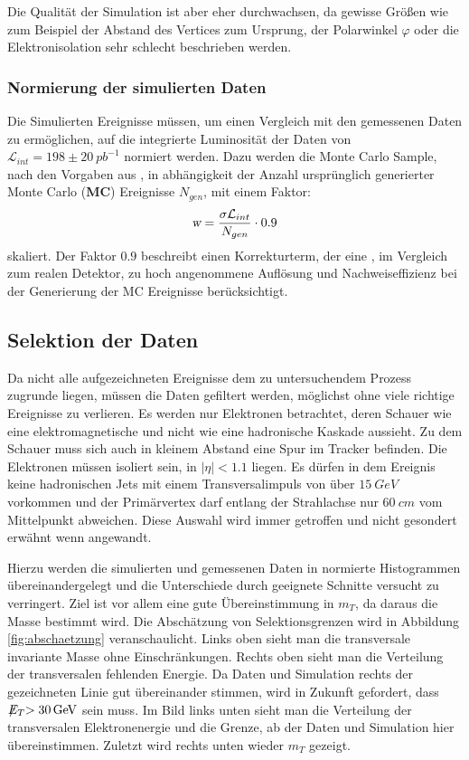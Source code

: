 \documentclass[a4paper,12pt]{article}
\newcommand{\met}{\ensuremath{\not\mathrel{E}}_T}
\begin{document}
Die Qualität der Simulation ist aber eher durchwachsen, da gewisse Größen wie zum Beispiel der
Abstand des Vertices zum Ursprung, der Polarwinkel $φ$ oder die Elektronisolation sehr schlecht
beschrieben werden.

\subsubsection*{Normierung der simulierten Daten}
Die Simulierten Ereignisse müssen, um einen Vergleich mit den gemessenen Daten zu ermöglichen, auf die 
integrierte Luminosität der Daten von $\mathcal{L}_{int}=198 \pm \SI{20}{pb^{-1}}$ normiert werden. 
Dazu werden die Monte Carlo Sample, nach den Vorgaben aus \cite{versuchsanleitung},
in abhängigkeit der Anzahl ursprünglich generierter Monte Carlo (\textbf{MC}) Ereignisse $N_{gen}$, mit einem Faktor:
\begin{align*}
	\textsl{w}= \frac{\sigma \mathcal{L}_{int}}{N_{gen}} \cdot 0.9
\end{align*}
skaliert. Der Faktor $0.9$ beschreibt einen Korrekturterm, der eine , im Vergleich zum realen Detektor,
zu hoch angenommene Auflösung und Nachweiseffizienz bei der Generierung der MC Ereignisse berücksichtigt.

\subsection{Selektion der Daten}
Da nicht alle aufgezeichneten Ereignisse dem zu untersuchendem Prozess zugrunde liegen, müssen die
Daten gefiltert werden, möglichst ohne viele richtige Ereignisse zu verlieren. Es werden nur
Elektronen betrachtet, deren Schauer wie eine elektromagnetische und nicht wie eine hadronische
Kaskade aussieht. Zu dem Schauer muss sich auch in kleinem Abstand eine Spur im Tracker befinden.
Die Elektronen müssen isoliert sein, in $|\eta| < 1.1$ liegen. Es dürfen in dem Ereignis keine
hadronischen Jets mit einem Transversalimpuls von über $\SI{15}{GeV}$ vorkommen und der Primärvertex
darf entlang der Strahlachse nur $\SI{60}{cm}$ vom Mittelpunkt abweichen. Diese Auswahl wird immer
getroffen und nicht gesondert erwähnt wenn angewandt.

Hierzu werden die simulierten und gemessenen Daten in normierte Histogrammen übereinandergelegt
und die Unterschiede durch geeignete Schnitte versucht zu verringert. Ziel ist vor allem eine gute
Übereinstimmung in $m_T$, da daraus die Masse bestimmt wird. Die Abschätzung von Selektionsgrenzen
wird in Abbildung \ref{fig:abschaetzung} veranschaulicht. Links oben sieht man die transversale
invariante Masse ohne Einschränkungen. Rechts oben sieht man die Verteilung der transversalen
fehlenden Energie. Da Daten und Simulation rechts der gezeichneten Linie gut übereinander stimmen,
wird in Zukunft gefordert, dass $\met > \SI{30}{GeV}$ sein muss. Im Bild links unten sieht man die
Verteilung der transversalen Elektronenergie und die Grenze, ab der Daten und Simulation hier
übereinstimmen. Zuletzt wird rechts unten wieder $m_T$ gezeigt.
\end{document}
